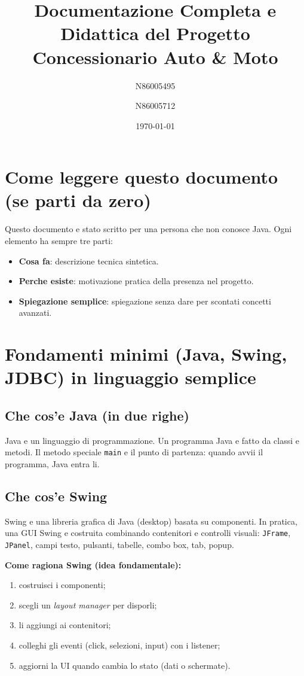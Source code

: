 \documentclass[12pt,a4paper]{article}
\title{Documentazione Completa e Didattica del Progetto\\Concessionario Auto \& Moto}
\author{N86005495 \and N86005712}
\date{\today}
\begin{document}
\maketitle
\tableofcontents
\newpage

\section{Come leggere questo documento (se parti da zero)}
Questo documento e stato scritto per una persona che non conosce Java.
Ogni elemento ha sempre tre parti:
\begin{itemize}
  \item \textbf{Cosa fa}: descrizione tecnica sintetica.
  \item \textbf{Perche esiste}: motivazione pratica della presenza nel progetto.
  \item \textbf{Spiegazione semplice}: spiegazione senza dare per scontati concetti avanzati.
\end{itemize}

\section{Fondamenti minimi (Java, Swing, JDBC) in linguaggio semplice}
\subsection{Che cos'e Java (in due righe)}
Java e un linguaggio di programmazione. Un programma Java e fatto da classi e metodi.
Il metodo speciale \texttt{main} e il punto di partenza: quando avvii il programma, Java entra li.

\subsection{Che cos'e Swing}
Swing e una libreria grafica di Java (desktop) basata su componenti.
In pratica, una GUI Swing e costruita combinando contenitori e controlli visuali:
\texttt{JFrame}, \texttt{JPanel}, campi testo, pulsanti, tabelle, combo box, tab, popup.

\textbf{Come ragiona Swing (idea fondamentale):}
\begin{enumerate}
  \item costruisci i componenti;
  \item scegli un \emph{layout manager} per disporli;
  \item li aggiungi ai contenitori;
  \item colleghi gli eventi (click, selezioni, input) con i listener;
  \item aggiorni la UI quando cambia lo stato (dati o schermate).
\end{enumerate}
\end{document}
